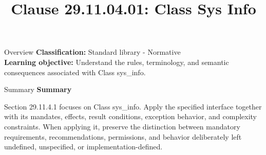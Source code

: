 \documentclass[10pt,letterpaper]{article}
\title{Clause 29.11.04.01: Class Sys Info}
\author{}
\date{}
\begin{document}
\maketitle
\begin{CornellOverviewBox}{Overview}
\textbf{Classification:} Standard library - Normative\\[2pt]
\textbf{Learning objective:} Understand the rules, terminology, and semantic consequences associated with Class sys\_info.
\end{CornellOverviewBox}\begin{CornellSummaryBox}{Summary}
{\sffamily\bfseries\color{Accent} Summary}\par\vspace{3pt}Section 29.11.4.1 focuses on Class sys\_info. Apply the specified interface together with its mandates, effects, result conditions, exception behavior, and complexity constraints. When applying it, preserve the distinction between mandatory requirements, recommendations, permissions, and behavior deliberately left undefined, unspecified, or implementation-defined.
\end{CornellSummaryBox}
\end{document}
